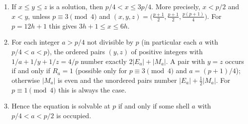 \begin{theorem}\label{thm:shell}
\begin{enumerate}[label=(\alph*)]
\item If $x\le y\le z$ is a solution, then $p/4<x\le3p/4$. More precisely, $x<p/2$ and $x<y$, unless $p\equiv3\pmod4$ and $(x,y,z)=\bigl(\frac{p+1}2,\frac{p+1}2,\frac{p(p+1)}4\bigr)$. For $p=12h+1$ this gives $3h+1\le x\le 6h$.
\item For each integer $a>p/4$ not divisible by $p$ (in particular each $a$ with $p/4<a<p$), the ordered pairs $(y,z)$ of positive integers with $1/a+1/y+1/z=4/p$ number exactly $2|E_a|+|M_a|$. A pair with $y=z$ occurs if and only if $R_a=1$ (possible only for $p\equiv3\pmod4$ and $a=(p+1)/4$); otherwise $|M_a|$ is even and the unordered pairs number $|E_a|+\tfrac12|M_a|$. For $p\equiv1\pmod4$ this is always the case.
\item Hence the equation is solvable at $p$ if and only if some shell $a$ with $p/4<a<p/2$ is occupied.
\end{enumerate}
\end{theorem}
